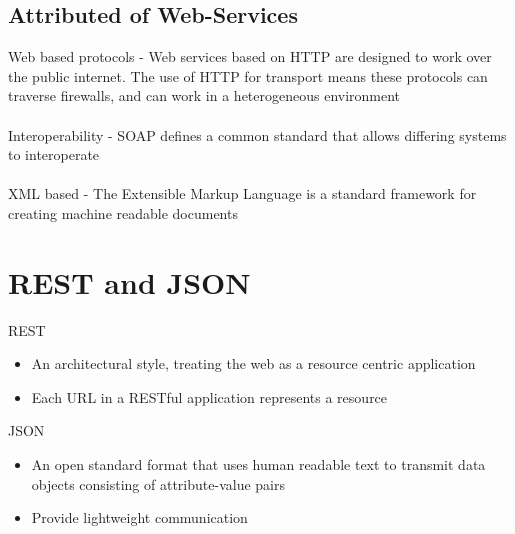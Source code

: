 \documentclass{article}[18pt]
\begin{document}
\subsection{Attributed of Web-Services}
Web based protocols - Web services based on HTTP are designed to work over the public internet. The use of HTTP for transport means these protocols can traverse firewalls, and can work in a heterogeneous environment\\
\\
Interoperability - SOAP defines a common standard that allows differing systems to interoperate\\
\\
XML based - The Extensible Markup Language is a standard framework for creating machine readable documents
\section{REST and JSON}
REST
\begin{itemize}
	\item An architectural style, treating the web as a resource centric application 
	\item Each URL in a RESTful application represents a resource
\end{itemize}
JSON
\begin{itemize}
	\item An open standard format that uses human readable text to transmit data objects consisting of attribute-value pairs
	\item Provide lightweight communication
\end{itemize}
\end{document}
